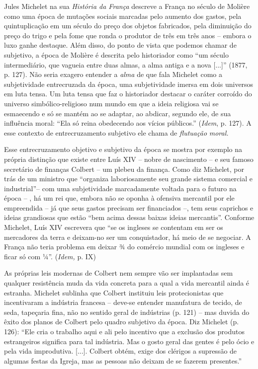 Jules Michelet na sua \emph{História da França} descreve a França no
século de Molière como uma época de mutações sociais marcadas pelo
aumento dos gastos, pela quintuplicação em um século do preço dos
objetos fabricados, pela diminuição do preço do trigo e pela fome que
ronda o produtor de três em três anos -- embora o luxo ganhe destaque.
Além disso, do ponto de vista que podemos chamar de subjetivo, a época
de Molière é descrita pelo historiador como ``um século intermediário,
que vagueia entre duas almas, a alma antiga e a nova {[}...{]}'' (1877,
p. 127). Não seria exagero entender a \emph{alma} de que fala Michelet
como a subjetividade entrecruzada da época, uma subjetividade imersa em
dois universos em luta tensa. Um luta tensa que faz o historiador
destacar o caráter corroído do universo simbólico-religioso num mundo em
que a ideia religiosa vai se esmaecendo e só se mantém ao se adaptar, ao
abdicar, segundo ele, de sua influência moral: ``Ela só reina obedecendo
aos vícios públicos.'' (\emph{Idem}, p. 127). A esse contexto de
entrecruzamento subjetivo ele chama de \emph{flutuação} \emph{moral.}

Esse entrecruzamento objetivo e subjetivo da época se mostra por exemplo
na própria distinção que existe entre Luís XIV -- nobre de nascimento --
e seu famoso secretário de finanças Colbert -- um plebeu da finança.
Como diz Michelet, por trás de um ministro que ``organiza laboriosamente
seu grande sistema comercial e industrial''-- com uma subjetividade
marcadamente voltada para o futuro na época -- , há um rei que, embora
não se oponha à ofensiva mercantil por ele empreendida -- já que seus
gastos precisam ser financiados --, tem seus caprichos e ideias
grandiosas que estão ``bem acima dessas baixas ideias mercantis''.
Conforme Michelet, Luís XIV escrevera que ``se os ingleses se contentam
em ser os mercadores da terra e deixam-no ser um conquistador, há meio
de se negociar. A França não teria problema em deixar ¾ do comércio
mundial com os ingleses e ficar só com ¼''. (\emph{Idem,} p. IX)

As próprias leis modernas de Colbert nem sempre vão ser implantadas sem
qualquer resistência muda da vida concreta para a qual a vida mercantil
ainda é estranha. Michelet sublinha que Colbert instituiu leis
protecionistas que incentivaram a indústria francesa -- deve-se entender
manufatura de tecido, de seda, tapeçaria fina, não no sentido geral de
indústrias (p. 121) -- mas duvida do êxito dos planos de Colbert pelo
quadro subjetivo da época. Diz Michelet (p. 126): ``Ele cria o trabalho
aqui e ali pelo incentivo que a exclusão dos produtos estrangeiros
significa para tal indústria. Mas o gosto geral das gentes é pelo ócio e
pela vida improdutiva. {[}...{]}. Colbert obtém, exige dos clérigos a
supressão de algumas festas da Igreja, mas as pessoas não deixam de se
fazerem presentes.''

